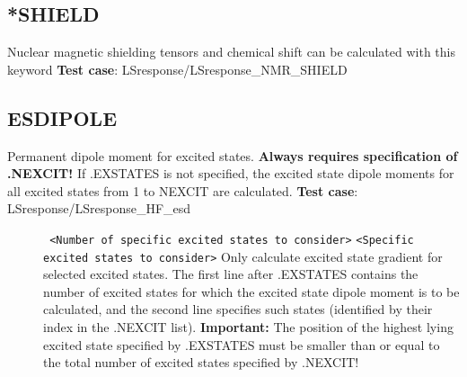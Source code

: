\subsection{*SHIELD}\label{nmrshield}
Nuclear magnetic shielding tensors and chemical shift can be calculated with this keyword
{\bf Test case}: LSresponse/LSresponse\_NMR\_SHIELD

\subsection*{ESDIPOLE}\label{subsec:esd}
Permanent dipole moment for excited states. 
{\bf Always requires specification of .NEXCIT!}\newline
If .EXSTATES is not specified, the excited state dipole moments
for all excited states from 1 to NEXCIT are calculated. \newline
{\bf Test case}: LSresponse/LSresponse\_HF\_esd
\begin{description}
\item[] \verb| | \newline
\verb|<Number of specific excited states to consider>|\newline
\verb|<Specific excited states to consider>|\newline
Only calculate excited state gradient for selected excited states.
The first line after .EXSTATES contains the number
of excited states for which the 
excited state dipole moment
is to be calculated,
and the second line specifies such states (identified by their 
index in the .NEXCIT list).
{\bf Important:} The position of the highest lying excited state
specified by .EXSTATES must be smaller than or equal to
the total number of excited states specified by .NEXCIT!
\end{description}

